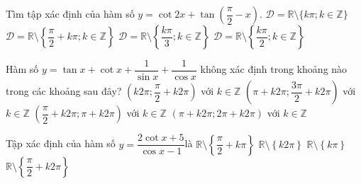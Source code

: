 \begin{ex}%
	Tìm tập xác định của hàm số $y=\cot  2x+\tan\left(\dfrac{\pi}{2}-x\right)$.
	\choice 
		{$\mathscr{D}=\mathbb{R}\setminus \{k\pi; k\in  \mathbb{Z}\}$}
		 {$\mathscr{D}=\mathbb{R}\setminus\left\{\dfrac{\pi}{2}+k\pi; k\in \mathbb{Z}\right\}$}
		{$\mathscr{D}=\mathbb{R}\setminus\left\{\dfrac{k\pi}{3};  k\in \mathbb{Z}\right\}$}
		{\True $\mathscr{D}=\mathbb{R}\setminus\left\{\dfrac{k\pi}{2}; k\in  \mathbb{Z}\right\}$}
\end{ex}

\begin{ex}%
	Hàm số $y=\tan x+\cot x+\dfrac{1}{\sin x}+\dfrac{1}{\cos x}$ không xác định trong khoảng nào trong các khoảng  sau đây?
	\choice 
		 {$\left(k2\pi;\dfrac{\pi}{2}+k2\pi\right)$ với $ k\in\mathbb{Z}$}
		{$\left(\pi+k2\pi;\dfrac{3\pi}{2}+k2\pi\right)$  với $ k\in\mathbb{Z}$}
		 {$\left(\dfrac{\pi}{2}+k2\pi;\pi+k2\pi\right)$ với $ k\in\mathbb{Z}$}
		{\True  $(\pi+k2\pi;2\pi+k2\pi)$ với $ k\in\mathbb{Z}$}
\end{ex}

\begin{ex}%
	Tập xác định của hàm số  $y=\dfrac{2\cot x+5}{\cos x-1}$là
	 \choice
		{$\mathbb{R}\setminus\left\{\dfrac{\pi}{2}+k\pi\right\}$} 
		{$\mathbb{R}\setminus\left\{ k2\pi\right\}$} 
		{\True $\mathbb{R}\setminus\left\{ k\pi\right\}$} 
		{$\mathbb{R}\setminus\left\{\dfrac{\pi}{2}+k2\pi\right\}$} 
\end{ex}

